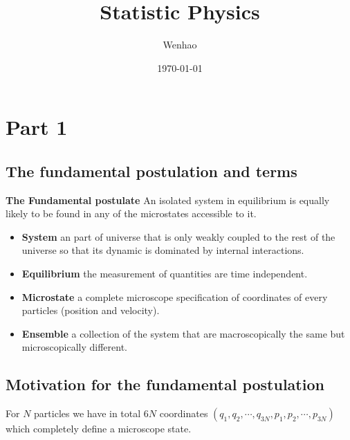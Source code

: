 \documentclass{article}
\begin{document}
\title{Statistic Physics}
\author{Wenhao}
\date{\today}

\section{Part 1}
\subsection{The fundamental postulation and terms}
\textbf{The Fundamental postulate} An isolated system in equilibrium is equally likely to be found in any
of the microstates accessible to it.

\begin{itemize}
    \item \textbf{System} an part of universe that is only weakly coupled to the rest of the universe 
    so that its dynamic is dominated by internal interactions.
    \item \textbf{Equilibrium} the measurement of quantities are time independent.
    \item \textbf{Microstate} a complete microscope specification of coordinates of every particles (position and velocity).
    \item \textbf{Ensemble} a collection of the system that are macroscopically the same but microscopically different. 
\end{itemize}

\subsection{Motivation for the fundamental postulation}
For $N$ particles we have in total $6N$ coordinates $(q_1, q_2, \cdots , q_{3N}, p_1, p_2, \cdots , p_{3N})$ which completely
define a microscope state.
\end{document}
